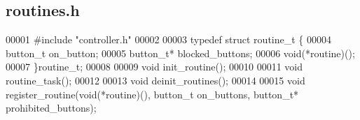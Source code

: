 \subsection{routines.\+h}
\label{routines_8h_source}

\begin{DoxyCode}
00001 \textcolor{preprocessor}{#include "controller.h"}
00002 
00003 \textcolor{keyword}{typedef} \textcolor{keyword}{struct }routine_t \{
00004   button_t on_button;
00005   button_t* blocked_buttons;
00006   void(*routine)();
00007 \}routine_t;
00008 
00009 \textcolor{keywordtype}{void} init_routine();
00010 
00011 \textcolor{keywordtype}{void} routine_task();
00012 
00013 \textcolor{keywordtype}{void} deinit_routines();
00014 
00015 \textcolor{keywordtype}{void} register_routine(\textcolor{keywordtype}{void}(*routine)(), button_t on\_buttons, button_t* prohibited\_buttons);
\end{DoxyCode}
